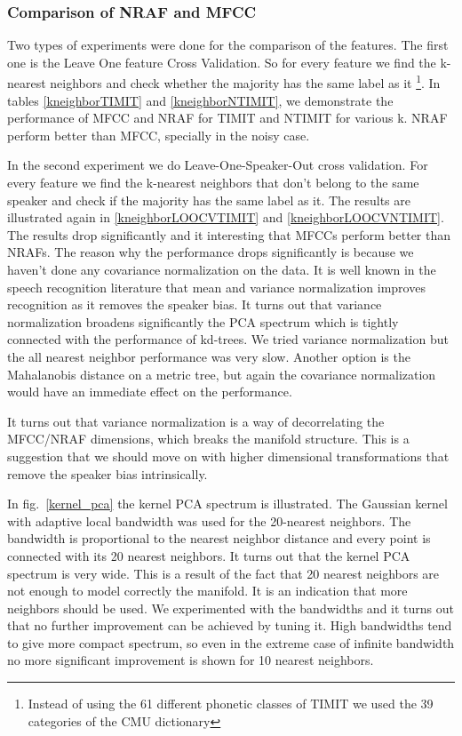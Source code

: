 \documentclass[12pt,letterpaper,doublespaced,ETD,dvips,proposal]{gtthesis}
\begin{document}
\begin{Body}
\subsubsection{Comparison of NRAF and MFCC} Two types of
experiments were done for the comparison of the features. The first
one is the Leave One feature Cross Validation. So for every feature
we find the k-nearest neighbors and check whether the majority has
the same label as it \footnote{Instead of using the 61 different
phonetic classes of TIMIT we used the 39 categories of the CMU
dictionary}. In tables \ref{kneighborTIMIT} and
\ref{kneighborNTIMIT}, we demonstrate the performance of MFCC and
NRAF for TIMIT and NTIMIT for various k. NRAF perform better than
MFCC, specially in the noisy case.

In the second experiment we do Leave-One-Speaker-Out cross
validation. For every feature we find the k-nearest neighbors that
don't belong to the same speaker and check if the majority has the
same label as it. The results are illustrated again in
\ref{kneighborLOOCVTIMIT} and \ref{kneighborLOOCVNTIMIT}. The
results drop significantly and it interesting that MFCCs perform
better than NRAFs. The reason why the performance drops
significantly is because we haven't done any covariance
normalization on the data. It is well known in the speech
recognition literature that mean and variance normalization improves
recognition as it removes the speaker bias. It turns out that
variance normalization broadens significantly the PCA spectrum which
is tightly connected with the performance of kd-trees. We tried
variance normalization but the all nearest neighbor performance was
very slow. Another option is the Mahalanobis distance on a metric
tree, but again the covariance normalization would have an immediate
effect on the performance.

It turns out that variance normalization is a way of decorrelating
the MFCC/NRAF dimensions, which breaks the manifold structure. This
is a suggestion that we should move on with higher dimensional
transformations that remove the speaker bias intrinsically.

In fig.~\ref{kernel_pca} the kernel PCA spectrum is illustrated. The
Gaussian kernel with adaptive local bandwidth was used for the
20-nearest neighbors. The bandwidth is proportional to the nearest
neighbor distance and every point is connected with its 20 nearest
neighbors. It turns out that the kernel PCA spectrum is very wide.
This is a result of the fact that 20 nearest neighbors are not
enough to model correctly the manifold. It is an indication that
more neighbors should be used. We experimented with the bandwidths
and it turns out that no further improvement can be achieved by
tuning it. High bandwidths tend to give more compact spectrum, so
even in the extreme case of infinite bandwidth no more significant
improvement is shown for 10 nearest neighbors.


\end{Body}
\end{document}
